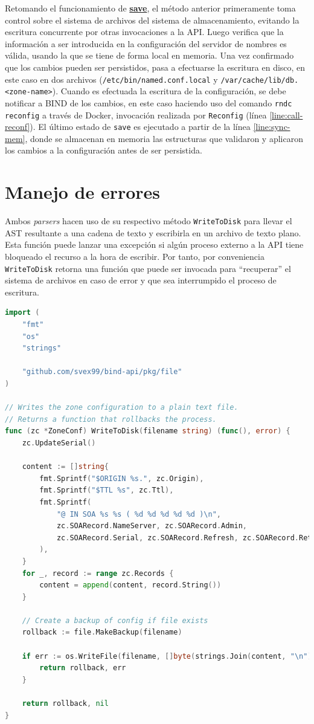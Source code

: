 Retomando el funcionamiento de \hyperref[proc:save]{\textbf{save}}, el método anterior primeramente toma control sobre el sistema de archivos del sistema de almacenamiento, evitando la escritura concurrente por otras invocaciones a la API. Luego verifica que la información a ser introducida en la configuración del servidor de nombres es válida, usando la que se tiene de forma local en memoria. Una vez confirmado que los cambios pueden ser persistidos, pasa a efectuarse la escritura en disco, en este caso en dos archivos (\verb|/etc/bin/named.conf.local| y \verb|/var/cache/lib/db.<zone-name>|). Cuando es efectuada la escritura de la configuración, se debe notificar a BIND de los cambios, en este caso haciendo uso del comando \verb|rndc reconfig| a través de Docker, invocación realizada por \verb|Reconfig| (línea \ref{line:call-reconf}). El último estado de \verb|save| es ejecutado a partir de la línea \ref{line:sync-mem}, donde se almacenan en memoria las estructuras que validaron y aplicaron los cambios a la configuración antes de ser persistida.

\section{Manejo de errores}

Ambos \textit{parsers} hacen uso de su respectivo método \verb|WriteToDisk| para llevar el AST resultante a una cadena de texto y escribirla en un archivo de texto plano. Esta función puede lanzar una excepción si algún proceso externo a la API tiene bloqueado el recurso a la hora de escribir. Por tanto, por conveniencia \verb|WriteToDisk| retorna una función que puede ser invocada para ``recuperar'' el sistema de archivos en caso de error y que sea interrumpido el proceso de escritura.

\begin{lstlisting}[frame=single, language=Go, caption=Implementación de \textbf{WriteToDisk} para el AST de una zona.]
import (
    "fmt"
    "os"
    "strings"

    "github.com/svex99/bind-api/pkg/file"
)

// Writes the zone configuration to a plain text file.
// Returns a function that rollbacks the process.
func (zc *ZoneConf) WriteToDisk(filename string) (func(), error) {
	zc.UpdateSerial()

	content := []string{
		fmt.Sprintf("$ORIGIN %s.", zc.Origin),
		fmt.Sprintf("$TTL %s", zc.Ttl),
		fmt.Sprintf(
			"@ IN SOA %s %s ( %d %d %d %d %d )\n",
			zc.SOARecord.NameServer, zc.SOARecord.Admin,
			zc.SOARecord.Serial, zc.SOARecord.Refresh, zc.SOARecord.Retry, zc.SOARecord.Expire, zc.SOARecord.Minimum,
		),
	}
	for _, record := range zc.Records {
		content = append(content, record.String())
	}

    // Create a backup of config if file exists
    rollback := file.MakeBackup(filename)

    if err := os.WriteFile(filename, []byte(strings.Join(content, "\n")), 0666); err != nil {
        return rollback, err
    }

    return rollback, nil
}
\end{lstlisting}

